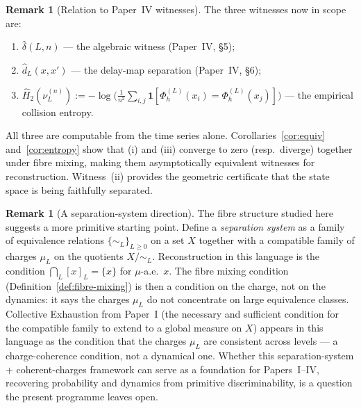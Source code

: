 \documentclass[11pt]{article}
\theoremstyle{definition}
\newtheorem{remark}[theorem]{Remark}
\newcommand{\PhiL}{\Phi_h^{(L)}}
\begin{document}
\begin{remark}[Relation to Paper~IV witnesses]
The three witnesses now in scope are:
\begin{enumerate}[label=(\roman*)]
  \item $\hat\delta(L,n)$ --- the algebraic witness (Paper~IV, \S5);
  \item $\hat d_L(x,x')$ --- the delay-map separation (Paper~IV, \S6);
  \item $\hat H_2(\nu_L^{(n)}) := -\log\bigl(\frac{1}{n^2}\sum_{i,j}
        \mathbf{1}[\PhiL(x_i) = \PhiL(x_j)]\bigr)$ --- the empirical
        collision entropy.
\end{enumerate}
All three are computable from the time series alone.
Corollaries~\ref{cor:equiv} and~\ref{cor:entropy} show that (i) and (iii)
converge to zero (resp.\ diverge) together under fibre mixing,
making them asymptotically equivalent witnesses for reconstruction.
Witness~(ii) provides the geometric certificate that the state space is
being faithfully separated.
\end{remark}

\begin{remark}[A separation-system direction]
\label{rem:paper-zero}
The fibre structure studied here suggests a more primitive starting point.
Define a \emph{separation system} as a family of equivalence relations
$\{\sim_L\}_{L \geq 0}$ on a set $X$ together with a compatible family of
charges $\mu_L$ on the quotients $X/{\sim_L}$.
Reconstruction in this language is the condition $\bigcap_L [x]_L = \{x\}$
for $\mu$-a.e.\ $x$.
The fibre mixing condition (Definition~\ref{def:fibre-mixing}) is then a
condition on the charge, not on the dynamics: it says the charges $\mu_L$ do
not concentrate on large equivalence classes.
Collective Exhaustion from Paper~I (the necessary and sufficient condition for
the compatible family to extend to a global measure on $X$) appears in this
language as the condition that the charges $\mu_L$ are consistent across levels
--- a charge-coherence condition, not a dynamical one.
Whether this separation-system + coherent-charges framework can serve as a
foundation for Papers~I--IV, recovering probability and dynamics from
primitive discriminability, is a question the present programme leaves open.
\end{remark}
\end{document}
